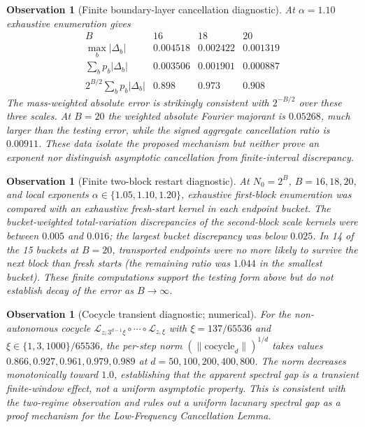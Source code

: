 \documentclass[12pt,a4paper]{article}
\newtheorem{observation}[theorem]{Observation}
\begin{document}
\begin{observation}[Finite boundary-layer cancellation diagnostic]
At $\alpha=1.10$ exhaustive enumeration gives
\[
\begin{array}{c|ccc}
 B&16&18&20\\ \hline
 \max_b|\Delta_b|&0.004518&0.002422&0.001319\\
 \sum_bp_b|\Delta_b|&0.003506&0.001901&0.000887\\
 2^{B/2}\sum_bp_b|\Delta_b|&0.898&0.973&0.908
\end{array}
\]
The mass-weighted absolute error is strikingly consistent with
$2^{-B/2}$ over these three scales.  At $B=20$ the weighted absolute Fourier
majorant is $0.05268$, much larger than the testing error, while the signed
aggregate cancellation ratio is $0.00911$.  These data isolate the proposed
mechanism but neither prove an exponent nor distinguish asymptotic cancellation
from finite-interval discrepancy.
\end{observation}

\begin{observation}[Finite two-block restart diagnostic]
At $N_0=2^B$, $B=16,18,20$, and local exponents
$\alpha\in\{1.05,1.10,1.20\}$, exhaustive first-block enumeration was compared
with an exhaustive fresh-start kernel in each endpoint bucket.  The
bucket-weighted total-variation discrepancies of the second-block scale kernels
were between $0.005$ and $0.016$; the largest bucket discrepancy was below
$0.025$.  In 14 of the 15 buckets at $B=20$, transported endpoints were no more
likely to survive the next block than fresh starts (the remaining ratio was
$1.044$ in the smallest bucket).  These finite computations support the testing
form above but do not establish decay of the error as $B\to\infty$.
\end{observation}

\begin{observation}[Cocycle transient diagnostic; numerical]
For the non-autonomous cocycle $\mathcal{L}_{z,3^{d-1}\xi}\circ\cdots\circ\mathcal{L}_{z,\xi}$
with $\xi = 137/65536$ and $\xi \in \{1,3,1000\}/65536$, the per-step norm
$(\|\text{cocycle}_d\|)^{1/d}$ takes values $0.866, 0.927, 0.961, 0.979, 0.989$
at $d = 50, 100, 200, 400, 800$. The norm decreases monotonically toward $1.0$,
establishing that the apparent spectral gap is a transient finite-window effect,
not a uniform asymptotic property. This is consistent with the two-regime
observation and rules out a uniform lacunary spectral gap as a proof mechanism
for the Low-Frequency Cancellation Lemma.
\end{observation}
\end{document}
